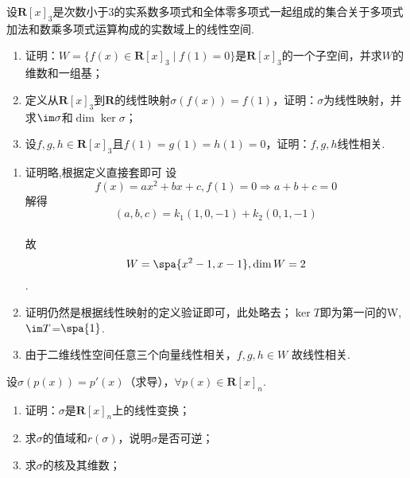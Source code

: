 \begin{exercise}
\begin{exgroup}
\begin{answer}
        \end{answer}

        \item 设$\mathbf{R}[x]_3$是次数小于3的实系数多项式和全体零多项式一起组成的集合关于多项式加法和数乘多项式运算构成的实数域上的线性空间.
        \begin{enumerate}
            \item 证明：$W=\{f(x)\in \mathbf{R}[x]_3 \mid f(1)=0\}$是$\mathbf{R}[x]_3$的一个子空间，并求$W$的维数和一组基；

            \item 定义从$\mathbf{R}[x]_3$到$\mathbf{R}$的线性映射$\sigma(f(x))=f(1)$，证明：$\sigma$为线性映射，并求$\im\sigma$和$\dim\ker\sigma$；

            \item 设$f,g,h \in \mathbf{R}[x]_3$且$f(1)=g(1)=h(1)=0$，证明：$f,g,h$线性相关.
        \end{enumerate}
        \begin{answer}
        \begin{enumerate}
        \item 证明略,根据定义直接套即可
        设\[f(x)=ax^2+bx+c,f(1)=0\Rightarrow a+b+c=0\]解得\[(a,b,c)=k_1(1,0,-1)+k_2(0,1,-1)\]\\
        故\[W=\spa \{x^2-1,x-1\},\dim W=2\].
        \item 证明仍然是根据线性映射的定义验证即可，此处略去；$\ker T$即为第一问的W,$\im T$=$\spa\{1\}$.
        \item 由于二维线性空间任意三个向量线性相关，$f,g,h \in W$ 故线性相关.
        \end{enumerate}
        \end{answer}

        \item 设$\sigma(p(x))=p'(x)$（求导），$\forall p(x) \in \mathbf{R}[x]_n$.
        \begin{enumerate}
            \item 证明：$\sigma$是$\mathbf{R}[x]_n$上的线性变换；

            \item 求$\sigma$的值域和$r(\sigma)$，说明$\sigma$是否可逆；

            \item 求$\sigma$的核及其维数；


\end{enumerate}
\end{exgroup}
\end{exercise}
